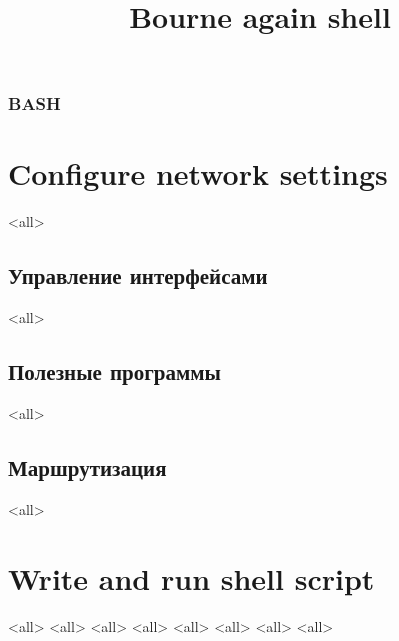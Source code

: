 
\title[bash]{Bourne again shell}




\begin{frame}
	\frametitle{BASH}
	\titlepage
	\vspace{-0.5cm}
	\begin{center}
	\end{center}
\end{frame}

\begin{frame}
	\tableofcontents
\end{frame}




\section{Configure network settings}
\mode<all>{} %

\subsection{Управление интерфейсами}
\mode<all>{}

\subsection{Полезные программы}
\mode<all>{}

\subsection{Маршрутизация}
\mode<all>{}

\section{Write and run shell script}
\mode<all>{}
\mode<all>{}
\mode<all>{}
\mode<all>{}
\mode<all>{}
\mode<all>{}
\mode<all>{}
\mode<all>{}

